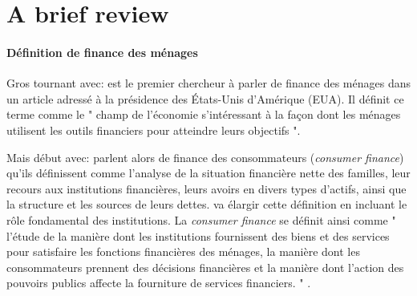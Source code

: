 \documentclass[a4paper, 11pt, onecolumn]{article}
\begin{document}






\newpage
\section{A brief review}

\paragraph{Définition de finance des ménages}
Gros tournant avec:
\cite{Campbell2006} est le premier chercheur à parler de finance des ménages dans un article adressé à la présidence des États-Unis d'Amérique (EUA).
Il définit ce terme comme le " champ de l'économie s'intéressant à la façon dont les ménages utilisent les outils financiers pour atteindre leurs objectifs ".

Mais début avec:
\cite{Avery1984} parlent alors de finance des consommateurs (\textit{consumer finance}) qu'ils définissent comme l'analyse de la situation financière nette des familles, leur recours aux institutions financières, leurs avoirs en divers types d'actifs, ainsi que la structure et les sources de leurs dettes.
\cite{Tufano2009} va élargir cette définition en incluant le rôle fondamental des institutions. 
La \textit{consumer finance} se définit ainsi comme " l'étude de la manière dont les institutions fournissent des biens et des services pour satisfaire les fonctions financières des ménages, la manière dont les consommateurs prennent des décisions financières et la manière dont l'action des pouvoirs publics affecte la fourniture de services financiers. " \citep{Tufano2009}.
\end{document}
